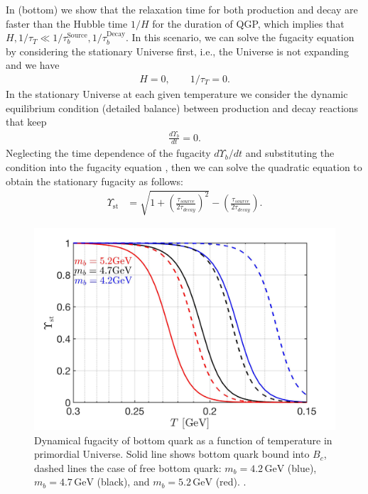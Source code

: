 In  (bottom) we show that the relaxation time for both production and decay are faster than the Hubble time $1/H$ for the duration of QGP, which implies that $H,1/\tau_T\ll1/\tau_{b}^{\mathrm{Source}},1/\tau^{\mathrm{Decay}}_b$. In this scenario, we can solve the fugacity equation by considering the stationary Universe first, i.e., the Universe is not expanding and we have
\begin{align}\label{stationary}
H=0,\qquad 1/\tau_T=0.
\end{align} 
In the stationary Universe at each given temperature we consider the dynamic equilibrium condition (detailed balance) between production and decay reactions that keep
\begin{align}
\frac{d\Upsilon_b}{dt}=0.
\end{align}
Neglecting the time dependence of the fugacity $d\Upsilon_b/dt$ and substituting the condition   into the fugacity equation , then we can solve the quadratic equation to obtain the stationary fugacity as follows: %
\begin{align}
\label{Fugacity_Sol}
\Upsilon_{\mathrm{st}}&=\sqrt{1+\left(\frac{\tau_{source}}{2\tau_{decay}}\right)^2}-\left(\frac{\tau_{source}}{2\tau_{decay}}\right).
\end{align} 

\begin{figure} 
\centerline{\includegraphics[width=0.9\linewidth]{./plots/BquarkFugacity_tot}}
\caption{Dynamical fugacity of bottom quark as a function of temperature in primordial Universe. Solid line shows bottom quark bound into $B_c$, dashed lines the case of free bottom quark: $m_b=4.2\,\mathrm{GeV}$ (blue), $m_b=4.7\,\mathrm{GeV}$ (black), and $m_b=5.2\,\mathrm{GeV}$ (red). . }
\label{fugacity_bc}
\end{figure}

